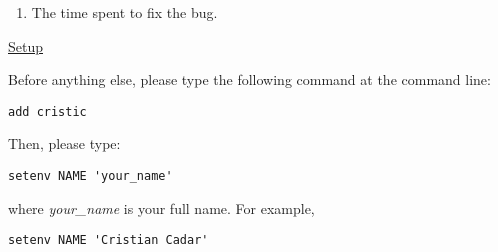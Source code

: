 \documentclass{article}
\begin{document}
\begin{flushleft}
\begin{enumerate}
\item{The time spent to fix the bug.}
\end{enumerate}


\vspace{0.2in}
\underline{Setup}

\vspace{0.05in}
Before anything else, please type the following command at the command line:
\begin{verbatim}
add cristic
\end{verbatim}


\vspace{0.1in}
Then, please type:
\begin{verbatim}
setenv NAME 'your_name'
\end{verbatim}

where {\it your\_name} is your full name.  For example, \\
\begin{verbatim}
setenv NAME 'Cristian Cadar'
\end{verbatim}


\end{flushleft}
\end{document}
